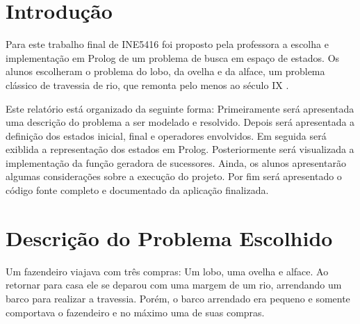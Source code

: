 \documentclass[brazil,times]{abnt}
\begin{document}





\data{\today}

\capa

\folhaderosto

\section*{Introdução}
	Para este trabalho final de INE5416 foi proposto pela professora a
	escolha e implementação em Prolog de um problema de busca em espaço de estados.
	Os alunos escolheram o problema do lobo, da ovelha e da alface, um problema
	clássico de travessia de rio, que remonta pelo menos ao século IX
	\cite{pressman:rivercrossing}.
	
	Este relatório está organizado da seguinte forma: Primeiramente será
	apresentada uma descrição do problema a ser modelado e resolvido. Depois será
	apresentada a definição dos estados inicial, final e operadores envolvidos. Em
	seguida será exiblida a representação dos estados em Prolog. Posteriormente
	será visualizada a implementação da função geradora de sucessores. Ainda, os
	alunos apresentarão algumas considerações sobre a execução do projeto. Por fim
	será apresentado o código fonte completo e documentado da aplicação finalizada.

\section*{Descrição do Problema Escolhido}
	Um fazendeiro viajava com três compras: Um lobo, uma ovelha e alface. Ao
	retornar para casa ele se deparou com uma margem de um rio, arrendando um barco
	para realizar a travessia. Porém, o barco arrendado era pequeno e somente
	comportava o fazendeiro e no máximo uma de suas compras.
	
\end{document}
